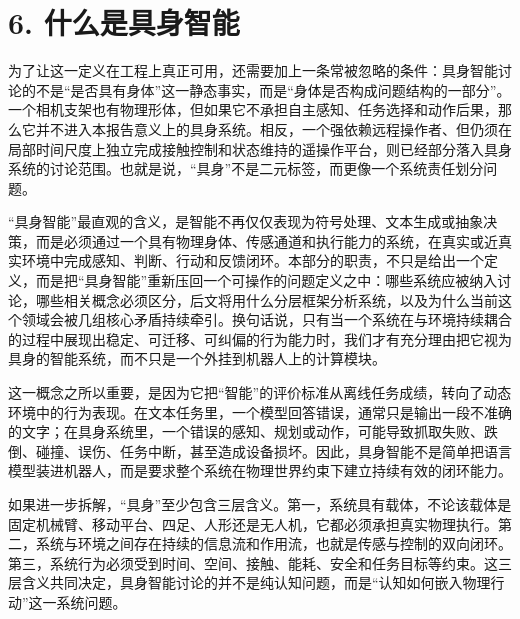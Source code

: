 

\section*{6. 什么是具身智能}

为了让这一定义在工程上真正可用，还需要加上一条常被忽略的条件：具身智能讨论的不是“是否具有身体”这一静态事实，而是“身体是否构成问题结构的一部分”。一个相机支架也有物理形体，但如果它不承担自主感知、任务选择和动作后果，那么它并不进入本报告意义上的具身系统。相反，一个强依赖远程操作者、但仍须在局部时间尺度上独立完成接触控制和状态维持的遥操作平台，则已经部分落入具身系统的讨论范围。也就是说，“具身”不是二元标签，而更像一个系统责任划分问题。

“具身智能”最直观的含义，是智能不再仅仅表现为符号处理、文本生成或抽象决策，而是必须通过一个具有物理身体、传感通道和执行能力的系统，在真实或近真实环境中完成感知、判断、行动和反馈闭环。本部分的职责，不只是给出一个定义，而是把“具身智能”重新压回一个可操作的问题定义之中：哪些系统应被纳入讨论，哪些相关概念必须区分，后文将用什么分层框架分析系统，以及为什么当前这个领域会被几组核心矛盾持续牵引。换句话说，只有当一个系统在与环境持续耦合的过程中展现出稳定、可迁移、可纠偏的行为能力时，我们才有充分理由把它视为具身的智能系统，而不只是一个外挂到机器人上的计算模块。

这一概念之所以重要，是因为它把“智能”的评价标准从离线任务成绩，转向了动态环境中的行为表现。在文本任务里，一个模型回答错误，通常只是输出一段不准确的文字；在具身系统里，一个错误的感知、规划或动作，可能导致抓取失败、跌倒、碰撞、误伤、任务中断，甚至造成设备损坏。因此，具身智能不是简单把语言模型装进机器人，而是要求整个系统在物理世界约束下建立持续有效的闭环能力。

如果进一步拆解，“具身”至少包含三层含义。第一，系统具有载体，不论该载体是固定机械臂、移动平台、四足、人形还是无人机，它都必须承担真实物理执行。第二，系统与环境之间存在持续的信息流和作用流，也就是传感与控制的双向闭环。第三，系统行为必须受到时间、空间、接触、能耗、安全和任务目标等约束。这三层含义共同决定，具身智能讨论的并不是纯认知问题，而是“认知如何嵌入物理行动”这一系统问题。

